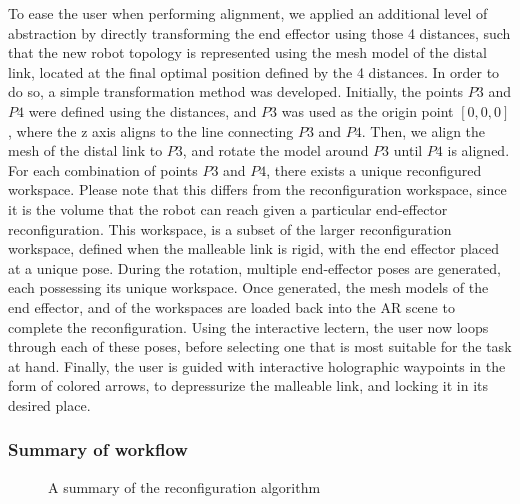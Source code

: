 To ease the user when performing alignment, we applied an additional level of abstraction by directly transforming the end effector using those 4 distances, such that the new robot topology is represented using the mesh model of the distal link, located at the final optimal position defined by the 4 distances. In order to do so, a simple transformation method was developed. Initially, the points $P3$ and $P4$ were defined using the distances, and $P3$ was used as the origin point $[0,0,0]$, where the z axis aligns to the line connecting $P3$ and $P4$. Then, we align the mesh of the distal link to $P3$, and rotate the model around $P3$ until $P4$ is aligned. For each combination of points $P3$ and $P4$, there exists a unique reconfigured workspace. Please note that this differs from the reconfiguration workspace, since it is the volume that the robot can reach given a particular end-effector reconfiguration. This workspace, is a subset of the larger reconfiguration workspace, defined when the malleable link is rigid, with the end effector placed at a unique pose.
During the rotation, multiple end-effector poses are generated, each possessing its unique workspace. Once generated, the mesh models of the end effector, and of the workspaces are loaded back into the AR scene to complete the reconfiguration. Using the interactive lectern, the user now loops through each of these poses, before selecting one that is most suitable for the task at hand. Finally, the user is guided with interactive holographic waypoints in the form of colored arrows, to depressurize the malleable link, and locking it in its desired place.

\subsubsection{Summary of workflow}

\begin{figure}[!t]
    \centering
    \caption{A summary of the reconfiguration algorithm}
    \label{fig:Flowchart}
\end{figure}


